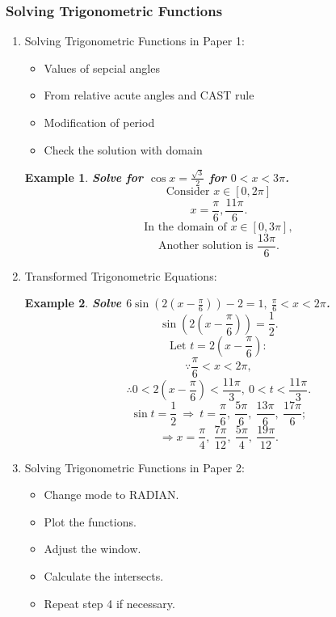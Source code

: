 \documentclass[12pt, a4paper]{article}
\newtheorem{example}{Example}[subsection]
\begin{document}
\subsubsection{Solving Trigonometric Functions}
\begin{enumerate}
  \item Solving Trigonometric Functions in Paper 1: 
  \begin{itemize}
    \item Values of sepcial angles
    \item From relative acute angles and CAST rule
    \item Modification of period
    \item Check the solution with domain
  \end{itemize}
  \begin{example}
    \textbf{Solve for $\cos{x}=\frac{\sqrt{3}}{2}$ for $0<x<3\pi$.}
    $$\text{Consider }x\in[0,2\pi]$$
    $$x=\frac{\pi}{6}, \frac{11\pi}{6}.$$
    $$\text{In the domain of }x\in[0,3\pi],$$
    $$\text{Another solution is }\frac{13\pi}{6}.$$
  \end{example}
  \item Transformed Trigonometric Equations: 
  \begin{example}
    \textbf{Solve $6\sin\left(2\left(x-\frac{\pi}{6}\right)\right)-2=1,\ \frac{\pi}{6}<x<2\pi$.}
    $$\sin\left(2\left(x-\frac{\pi}{6}\right)\right)=\frac{1}{2}.$$
    $$\text{Let }t=2\left(x-\frac{\pi}{6}\right):$$
    $$\because \frac{\pi}{6}<x<2\pi, $$
    $$\therefore 0<2\left(x-\frac{\pi}{6}\right)<\frac{11\pi}{3},\ 0<t<\frac{11\pi}{3}.$$
    $$\sin t=\frac{1}{2}\ \Rightarrow\ t=\frac{\pi}{6},\ \frac{5\pi}{6},\ \frac{13\pi}{6},\ \frac{17\pi}{6};$$
    $$\Rightarrow x=\frac{\pi}{4},\ \frac{7\pi}{12},\ \frac{5\pi}{4},\ \frac{19\pi}{12}.$$
  \end{example}
  \item Solving Trigonometric Functions in Paper 2: 
  \begin{itemize}
    \item Change mode to RADIAN.
    \item Plot the functions. 
    \item Adjust the window. 
    \item Calculate the intersects.
    \item Repeat step 4 if necessary. 
  \end{itemize}
\end{enumerate}
\end{document}
